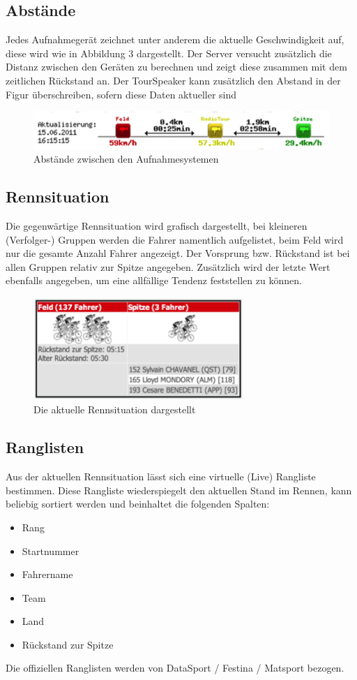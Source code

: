 \subsection{Abstände}
Jedes Aufnahmegerät zeichnet unter anderem die aktuelle Geschwindigkeit auf, diese wird wie in Abbildung 3 dargestellt. Der Server versucht zusätzlich die Distanz zwischen den Geräten zu berechnen und zeigt diese zusammen mit dem zeitlichen Rückstand an. Der TourSpeaker kann zusätzlich den Abstand in der Figur überschreiben, sofern diese Daten aktueller sind
\begin{figure}[H]
	\centering
	\includegraphics[width=130mm]{images/abstaende.png}
	\caption{Abstände zwischen den Aufnahmesystemen}
\end{figure}

\subsection{Rennsituation}
Die gegenwärtige Rennsituation wird grafisch dargestellt, bei kleineren (Verfolger-) Gruppen werden die Fahrer namentlich aufgelistet, beim Feld wird nur die gesamte Anzahl Fahrer angezeigt. Der Vorsprung bzw. Rückstand ist bei allen Gruppen relativ zur Spitze angegeben. Zusätzlich wird der letzte Wert ebenfalls angegeben, um eine allfällige Tendenz feststellen zu können.
\begin{figure}[H]
	\centering
	\includegraphics[width=80mm]{images/rennsituation.png}
	\caption{Die aktuelle Rennsituation dargestellt}
\end{figure}
\subsection{Ranglisten}
Aus der aktuellen Rennsituation lässt sich eine virtuelle (Live) Rangliste bestimmen. Diese Rangliste wiederspiegelt den aktuellen Stand im Rennen, kann beliebig sortiert werden und beinhaltet die folgenden Spalten:
\begin{itemize}
\item Rang
\item Startnummer
\item Fahrername
\item Team
\item Land
\item Rückstand zur Spitze
\end{itemize}
Die offiziellen Ranglisten werden von DataSport / Festina / Matsport bezogen.
